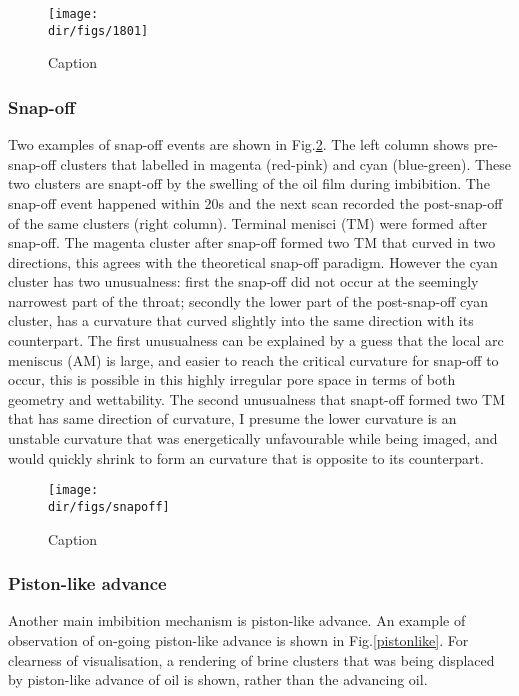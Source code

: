 \begin{figure}
    \centering
    \texttt{[image: \\dir/figs/1801]}
    \caption{Caption}
    \label{1801}
\end{figure}

\subsubsection{Snap-off}
Two examples of snap-off events are shown in Fig.\ref{snapoff}. The left column shows pre-snap-off clusters that labelled in magenta (red-pink) and cyan (blue-green). These two clusters are snapt-off by the swelling of the oil film during imbibition. The snap-off event happened within 20s and the next scan recorded the post-snap-off of the same clusters (right column). Terminal menisci (TM) were formed after snap-off. The magenta cluster after snap-off formed two TM that curved in two directions, this agrees with the theoretical snap-off paradigm. However the cyan cluster has two unusualness: first the snap-off did not occur at the seemingly narrowest part of the throat; secondly the lower part of the post-snap-off cyan cluster, has a curvature that curved slightly into the same direction with its counterpart. The first unusualness can be explained by a guess that the local arc meniscus (AM) is large, and easier to reach the critical curvature for snap-off to occur, this is possible in this highly irregular pore space in terms of both geometry and wettability. The second unusualness that snapt-off formed two TM that has same direction of curvature, I presume the lower curvature is an unstable curvature that was energetically unfavourable while being imaged, and would quickly shrink to form an curvature that is opposite to its counterpart.

\begin{figure}
    \centering
    \texttt{[image: \\dir/figs/snapoff]}
    \caption{Caption}
    \label{snapoff}
\end{figure}

\subsubsection{Piston-like advance}
Another main imbibition mechanism is piston-like advance. An example of observation of on-going piston-like advance is shown in Fig.\ref{pistonlike}. For clearness of visualisation, a rendering of brine clusters that was being displaced by piston-like advance of oil is shown, rather than the advancing oil.

